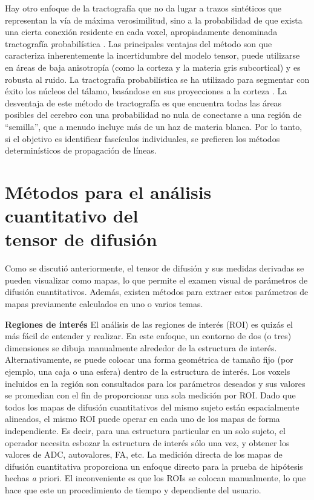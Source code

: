 Hay otro enfoque de la tractografía que no da lugar a trazos sintéticos que representan la vía de máxima verosimilitud, sino a la probabilidad de que exista una cierta conexión residente en cada voxel, apropiadamente denominada tractografía {\emph probabilística} \cite{Behrens_2003}. Las principales ventajas del método son que caracteriza inherentemente la incertidumbre del modelo tensor, puede utilizarse en áreas de baja anisotropía (como la corteza y la materia gris subcortical) y es robusta al ruido. La tractografía probabilística se ha utilizado para segmentar con éxito los núcleos del tálamo, basándose en sus proyecciones a la corteza \cite{Behrens_2003a}. La desventaja de este método de tractografía es que encuentra todas las áreas posibles del cerebro con una probabilidad no nula de conectarse a una región de ``semilla'', que a menudo incluye más de un haz de materia blanca. Por lo tanto, si el objetivo es identificar fascículos individuales, se prefieren los métodos determinísticos de propagación de líneas.

\section{Métodos para el análisis cuantitativo del\\ tensor de difusión}

Como se discutió anteriormente, el tensor de difusión y sus medidas derivadas se pueden visualizar como mapas, lo que permite el examen visual de parámetros de difusión cuantitativos. Además, existen métodos para extraer estos parámetros de mapas previamente calculados en uno o varios temas.

\textbf {Regiones de interés} El análisis de las regiones de interés (ROI) es quizás el más fácil de entender y realizar. En este enfoque, un contorno de dos (o tres) dimensiones se dibuja manualmente alrededor de la estructura de interés. Alternativamente, se puede colocar una forma geométrica de tamaño fijo (por ejemplo, una caja o una esfera) dentro de la estructura de interés. Los voxels incluidos en la región son consultados para los parámetros deseados y sus valores se promedian con el fin de proporcionar una sola medición por ROI. Dado que todos los mapas de difusión cuantitativos del mismo sujeto están espacialmente alineados, el mismo ROI puede operar en cada uno de los mapas de forma independiente. Es decir, para una estructura particular en un solo sujeto, el operador necesita esbozar la estructura de interés sólo una vez, y obtener los valores de ADC, autovalores, FA, etc. La medición directa de los mapas de difusión cuantitativa proporciona un enfoque directo para la prueba de hipótesis hechas {\emph a priori}. El inconveniente es que los ROIs se colocan manualmente, lo que hace que este un procedimiento de tiempo y dependiente del usuario.

